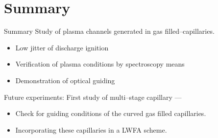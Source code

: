 \documentclass[dvipsnames]{beamer}
\begin{document}
% 
\section{Summary}
\begin{frame}{Summary}
Study of plasma channels generated in gas filled--capillaries.

\begin{itemize}
\item Low jitter of discharge ignition
\item Verification of plasma conditions by spectroscopy means
\item Demonstration of optical guiding
\end{itemize}
Future experiments: First study of multi--stage capillary ---
\begin{itemize}
\item Check for guiding conditions of the curved gas filled capillaries.
\item Incorporating these capillaries in a LWFA scheme.
\end{itemize}

\end{frame}
%     
\end{document}
